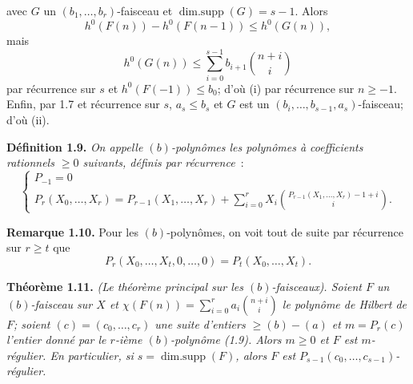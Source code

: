 
avec \(G\) un \((b_1,\ldots,b_r)\)-faisceau et \(\operatorname{dim{.}supp}(G)=s-1\). Alors
\[
h^0(F(n))-h^0(F(n-1))\le h^0(G(n)),
\]
mais
\[
h^0(G(n))\le\sum_{i=0}^{s-1}b_{i+1}\binom{n+i}{i}
\]
par récurrence sur \(s\) et \(h^0(F(-1))\le b_0\); d'où (i) par récurrence sur \(n\ge -1\). Enfin, par 1.7 et récurrence sur \(s\), \(a_s\le b_s\) et \(G\) est un \((b_i,\ldots,b_{s-1},a_s)\)-faisceau; d'où (ii).

\textbf{Définition 1.9.} \emph{On appelle \emph{\((b)\)-polynômes} les polynômes à coefficients rationnels \(\ge0\) suivants, définis par récurrence}~:
\[
\begin{cases}
P_{-1}=0\\
P_r(X_0,\ldots,X_r)=P_{r-1}(X_1,\ldots,X_r)
+\displaystyle\sum_{i=0}^{r}X_i
\binom{P_{r-1}(X_1,\ldots,X_r)-1+i}{i}.
\end{cases}
\]

\textbf{Remarque 1.10.} Pour les \((b)\)-polynômes, on voit tout de suite par récurrence sur \(r\ge t\) que
\[
P_r(X_0,\ldots,X_t,0,\ldots,0)=P_t(X_0,\ldots,X_t).
\]

\textbf{Théorème 1.11.} \emph{(Le théorème principal sur les \((b)\)-faisceaux). Soient \(F\) un \((b)\)-faisceau sur \(X\) et \(\chi(F(n))=\sum_{i=0}^{r}a_i\binom{n+i}{i}\) le polynôme de Hilbert de \(F\); soient \((c)=(c_0,\ldots,c_r)\) une suite d'entiers \(\ge (b)-(a)\) et \(m=P_r(c)\) l'entier donné par le \(r\)-ième \((b)\)-polynôme (1.9). Alors \(m\ge0\) et \(F\) est \(m\)-régulier. En particulier, si \(s=\operatorname{dim{.}supp}(F)\), alors \(F\) est \(P_{s-1}(c_0,\ldots,c_{s-1})\)-régulier.}

